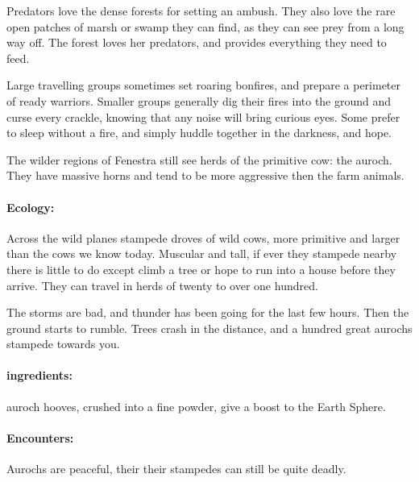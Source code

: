 \begin{multicols}{2}

\noindent
Predators love the dense forests for setting an ambush.
They also love the rare open patches of marsh or swamp they can find, as they can see prey from a long way off.
The forest loves her predators, and provides everything they need to feed.

Large travelling groups sometimes set roaring bonfires, and prepare a perimeter of ready warriors.
Smaller groups generally dig their fires into the ground and curse every crackle, knowing that any noise will bring curious eyes.
Some prefer to sleep without a fire, and simply huddle together in the darkness, and hope.


\label{auroch}

The wilder regions of Fenestra still see herds of the primitive cow: the auroch.
They have massive horns and tend to be more aggressive then the farm animals.


\paragraph{Ecology:} Across the wild planes stampede droves of wild cows, more primitive and larger than the cows we know today.
Muscular and tall, if ever they stampede nearby there is little to do except climb a tree or hope to run into a house before they arrive.
They can travel in herds of twenty to over one hundred.

\begin{boxtext}

  The storms are bad, and thunder has been going for the last few hours.  Then the ground starts to rumble.  Trees crash in the distance, and a hundred great aurochs stampede towards you.

\end{boxtext}

\paragraph{\Glspl{ingredient}:}
auroch hooves, crushed into a fine powder, give a boost to the Earth Sphere.

\paragraph{Encounters:} Aurochs are peaceful, their their stampedes can still be quite deadly.


\end{multicols}
